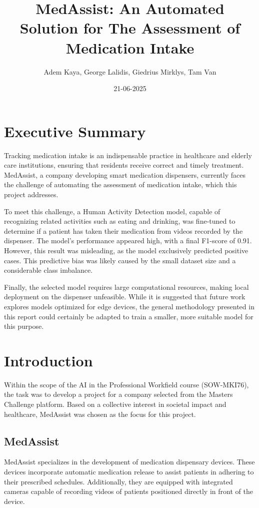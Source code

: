 \documentclass[a4paper,12pt]{article}
\title{MedAssist: An Automated Solution for The Assessment of Medication Intake}
\author{Adem Kaya, George Lalidis, Giedrius Mirklys, Tam Van}
\date{21-06-2025}
\begin{document}
\maketitle

\section{Executive Summary}

Tracking medication intake is an indispensable practice in healthcare and elderly care institutions, ensuring that residents receive correct and timely treatment. MedAssist, a company developing smart medication dispensers, currently faces the challenge of automating the assessment of medication intake, which this project addresses.

To meet this challenge, a Human Activity Detection model, capable of recognizing related activities such as eating and drinking, was fine-tuned to determine if a patient has taken their medication from videos recorded by the dispenser. The model's performance appeared high, with a final F1-score of 0.91. However, this result was misleading, as the model exclusively predicted positive cases. This predictive bias was likely caused by the small dataset size and a considerable class imbalance.

Finally, the selected model requires large computational resources, making local deployment on the dispenser unfeasible. While it is suggested that future work explores models optimized for edge devices, the general methodology presented in this report could certainly be adapted to train a smaller, more suitable model for this purpose.

\section{Introduction}
Within the scope of the AI in the Professional Workfield course (SOW-MKI76), the task was to develop a project for a 
company selected from the Masters Challenge platform. Based on a collective interest in societal impact and healthcare, 
MedAssist was chosen as the focus for this project.

\subsection{MedAssist}
MedAssist specializes in the development of medication dispensary devices. These devices incorporate automatic medication
 release to assist patients in adhering to their prescribed schedules. Additionally, they are equipped with integrated
  cameras capable of recording videos of patients positioned directly in front of the device.
\end{document}
